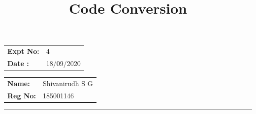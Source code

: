 \documentclass[12pt,a4paper]{article}
\title{\bf Code Conversion}
\author{\vspace{-10ex}}
\date{\vspace{-10ex}}
\begin{document}
\maketitle

\begin{minipage}{0.45\textwidth}
        \begin{tabular}{l l}
            \textbf{Expt No:}&4\\
            \textbf{Date :}&18/09/2020
        \end{tabular}
\end{minipage}%
\begin{minipage}{0.45\textwidth}
        \begin{tabular}{l l}
             \textbf{Name:}& Shivanirudh S G  \\
             \textbf{Reg No:} & 185001146 
        \end{tabular}
\end{minipage}
\vspace{1cm}
\hrule
\end{document}
